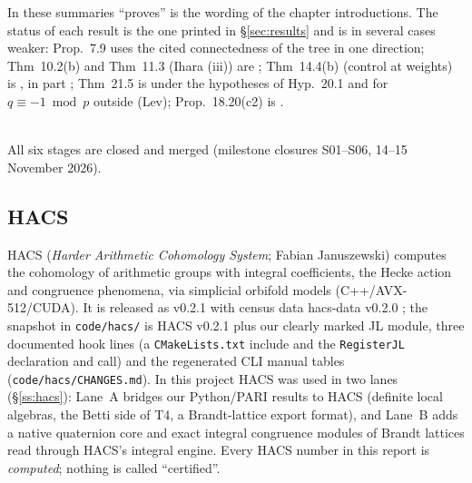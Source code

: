 \noindent In these summaries ``proves'' is the wording of the chapter introductions. The status of each result is the one
printed in \S\ref{sec:results} and is in several cases weaker: Prop.~7.9 uses the cited connectedness of the tree in one
direction; Thm~10.2(b) and Thm~11.3 (Ihara (iii)) are \stpmc; Thm~14.4(b) (control at weights) is \stcited, in part
\stexp; Thm~21.5 is \stpmc{} under the hypotheses of Hyp.~20.1 and \stopen{} for $q\equiv-1\bmod p$ outside (Lev);
Prop.~18.20(c2) is \stopen.

\begin{center}
\\[2pt]
{\small All six stages are closed and merged (milestone closures S01--S06, 14--15 November 2026).}
\end{center}

\subsection{HACS}
HACS (\emph{Harder Arithmetic Cohomology System}; Fabian Januszewski) computes the cohomology of arithmetic groups with
integral coefficients, the Hecke action and congruence phenomena, via simplicial orbifold models (C++/AVX-512/CUDA). It is released as v0.2.1 \cite{HACS021} with census data hacs-data v0.2.0 \cite{HACSdata020}; the snapshot
in \texttt{code/hacs/} is HACS v0.2.1 plus our clearly marked JL module, three documented hook lines (a \texttt{CMakeLists.txt}
include and the \texttt{RegisterJL} declaration and call) and the regenerated CLI manual tables (\texttt{code/hacs/CHANGES.md}). In this project HACS was used in two lanes (\S\ref{ss:hacs}): Lane~A
bridges our Python/PARI results to HACS (definite local algebras, the Betti side of T4, a Brandt-lattice export format),
and Lane~B adds a native quaternion core and exact integral congruence modules of Brandt lattices read through HACS's
integral engine. Every HACS number in this report is \emph{computed}; nothing is called ``certified''.


